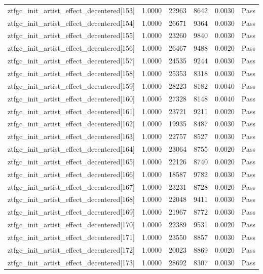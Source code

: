 \begin{table}[htbp]
\begin{tabular}{llrrll}
ztfgc\_init\_artist\_effect\_decentered[153] & 1.0000 & 22963 & 8642 & 0.0030 & Pass \\
ztfgc\_init\_artist\_effect\_decentered[154] & 1.0000 & 26671 & 9364 & 0.0030 & Pass \\
ztfgc\_init\_artist\_effect\_decentered[155] & 1.0000 & 23260 & 9840 & 0.0030 & Pass \\
ztfgc\_init\_artist\_effect\_decentered[156] & 1.0000 & 26467 & 9488 & 0.0020 & Pass \\
ztfgc\_init\_artist\_effect\_decentered[157] & 1.0000 & 24535 & 9244 & 0.0030 & Pass \\
ztfgc\_init\_artist\_effect\_decentered[158] & 1.0000 & 25353 & 8318 & 0.0030 & Pass \\
ztfgc\_init\_artist\_effect\_decentered[159] & 1.0000 & 28223 & 8182 & 0.0040 & Pass \\
ztfgc\_init\_artist\_effect\_decentered[160] & 1.0000 & 27328 & 8148 & 0.0040 & Pass \\
ztfgc\_init\_artist\_effect\_decentered[161] & 1.0000 & 23721 & 9211 & 0.0020 & Pass \\
ztfgc\_init\_artist\_effect\_decentered[162] & 1.0000 & 19935 & 8487 & 0.0030 & Pass \\
ztfgc\_init\_artist\_effect\_decentered[163] & 1.0000 & 22757 & 8527 & 0.0030 & Pass \\
ztfgc\_init\_artist\_effect\_decentered[164] & 1.0000 & 23064 & 8755 & 0.0020 & Pass \\
ztfgc\_init\_artist\_effect\_decentered[165] & 1.0000 & 22126 & 8740 & 0.0020 & Pass \\
ztfgc\_init\_artist\_effect\_decentered[166] & 1.0000 & 18587 & 9782 & 0.0030 & Pass \\
ztfgc\_init\_artist\_effect\_decentered[167] & 1.0000 & 23231 & 8728 & 0.0020 & Pass \\
ztfgc\_init\_artist\_effect\_decentered[168] & 1.0000 & 22048 & 9411 & 0.0030 & Pass \\
ztfgc\_init\_artist\_effect\_decentered[169] & 1.0000 & 21967 & 8772 & 0.0030 & Pass \\
ztfgc\_init\_artist\_effect\_decentered[170] & 1.0000 & 22389 & 9531 & 0.0020 & Pass \\
ztfgc\_init\_artist\_effect\_decentered[171] & 1.0000 & 23550 & 8857 & 0.0030 & Pass \\
ztfgc\_init\_artist\_effect\_decentered[172] & 1.0000 & 20023 & 8869 & 0.0020 & Pass \\
ztfgc\_init\_artist\_effect\_decentered[173] & 1.0000 & 28692 & 8307 & 0.0030 & Pass \\

\end{tabular}
\end{table}
